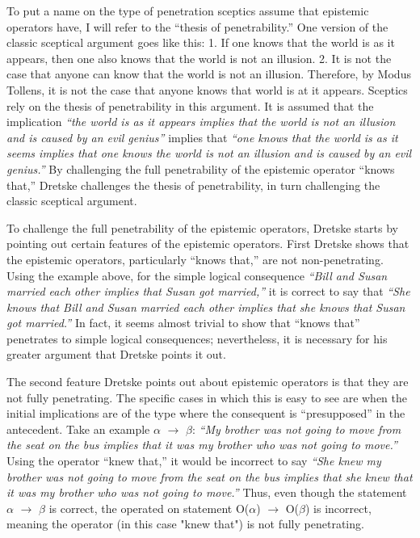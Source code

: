 \documentclass[12pt,letterpaper]{report}
\begin{document}
To put a name on the type of penetration sceptics assume that epistemic operators have, I will refer to the ``thesis of penetrability.'' One version of the classic sceptical argument goes like this: 1. If one knows that the world is as it appears, then one also knows that the world is not an illusion. 2. It is not the case that anyone can know that the world is not an illusion. Therefore, by Modus Tollens, it is not the case that anyone knows that world is at it appears. Sceptics rely on the thesis of penetrability in this argument. It is assumed that the implication \textit{``the world is as it appears implies that the world is not an illusion and is caused by an evil genius''} implies that \textit{``one knows that the world is as it seems implies that one knows the world is not an illusion and is caused by an evil genius.''} By challenging the full penetrability of the epistemic operator ``knows that,'' Dretske challenges the thesis of penetrability, in turn challenging the classic sceptical argument.

To challenge the full penetrability of the epistemic operators, Dretske starts by pointing out certain features of the epistemic operators. First Dretske shows that the epistemic operators, particularly ``knows that,'' are not non-penetrating. Using the example above, for the simple logical consequence \textit{``Bill and Susan married each other implies that Susan got married,''} it is correct to say that \textit{``She knows that Bill and Susan married each other implies that she knows that Susan got married.''} In fact, it seems almost trivial to show that ``knows that'' penetrates to simple logical consequences; nevertheless, it is necessary for his greater argument that Dretske points it out.

The second feature Dretske points out about epistemic operators is that they are not fully penetrating. The specific cases in which this is easy to see are when the initial implications are of the type where the consequent is ``presupposed'' in the antecedent. Take an example $\alpha$ $\rightarrow$ $\beta$: \textit{``My brother was not going to move from the seat on the bus implies that it was my brother who was not going to move.''} Using the operator ``knew that,'' it would be incorrect to say \textit{``She knew my brother was not going to move from the seat on the bus implies that she knew that it was my brother who was not going to move.''} Thus, even though the statement $\alpha$ $\rightarrow$ $\beta$ is correct, the operated on statement O($\alpha$) $\rightarrow$ O($\beta$) is incorrect, meaning the operator (in this case "knew that") is not fully penetrating.
\end{document}
